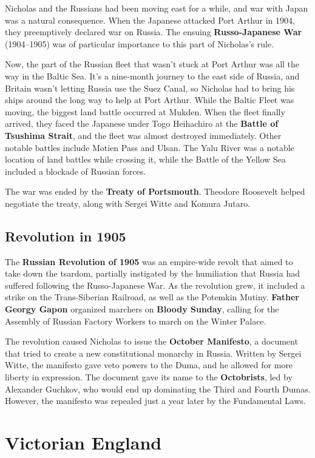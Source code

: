Nicholas and the Russians had been moving east for a while,
and war with Japan was a natural consequence.
When the Japanese attacked Port Arthur in 1904, they preemptively declared war on Russia.
The ensuing \textbf{Russo-Japanese War} (1904--1905)
was of particular importance to this part of Nicholas's rule.

Now, the part of the Russian fleet
that wasn't stuck at Port Arthur was all the way in the Baltic Sea.
It's a nine-month journey to the east side of Russia,
and Britain wasn't letting Russia use the Suez Canal,
so Nicholas had to bring his ships around the long way to help at Port Arthur.
While the Baltic Fleet was moving, the biggest land battle occurred at Mukden.
When the fleet finally arrived,
they faced the Japanese under Togo Heihachiro at the \textbf{Battle of Tsushima Strait},
and the fleet was almost destroyed immediately.
Other notable battles include Motien Pass and Ulsan.
The Yalu River was a notable location of land battles while crossing it,
while the Battle of the Yellow Sea included a blockade of Russian forces.

The war was ended by the \textbf{Treaty of Portsmouth}.
Theodore Roosevelt helped negotiate the treaty, along with Sergei Witte and Komura Jutaro.

\subsection*{Revolution in 1905}

The \textbf{Russian Revolution of 1905}
was an empire-wide revolt that aimed to take down the tsardom,
partially instigated by the humiliation that Russia had suffered following the Russo-Japanese War.
As the revolution grew, it included a strike on the Trans-Siberian Railroad,
as well as the Potemkin Mutiny.
\textbf{Father Georgy Gapon} organized marchers on \textbf{Bloody Sunday},
calling for the Assembly of Russian Factory Workers to march on the Winter Palace.

The revolution caused Nicholas to issue the \textbf{October Manifesto},
a document that tried to create a new constitutional monarchy in Russia.
Written by Sergei Witte,
the manifesto gave veto powers to the Duma, and he allowed for more liberty in expression.
The document gave its name to the \textbf{Octobrists}, led by Alexander Guchkov,
who would end up dominating the Third and Fourth Dumas.
However, the manifesto was repealed just a year later by the Fundamental Laws.

\section{Victorian England}

